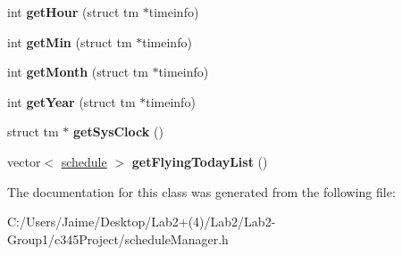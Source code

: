 \begin{DoxyCompactItemize}
\item 
\hypertarget{classschedule_manager_a78ccab8b133ca7f7fe31bf6766cbd026}{
int {\bfseries getHour} (struct tm $\ast$timeinfo)}
\label{classschedule_manager_a78ccab8b133ca7f7fe31bf6766cbd026}

\item 
\hypertarget{classschedule_manager_aa83bfdf345a9cde974eebf53ce096e2e}{
int {\bfseries getMin} (struct tm $\ast$timeinfo)}
\label{classschedule_manager_aa83bfdf345a9cde974eebf53ce096e2e}

\item 
\hypertarget{classschedule_manager_ac440259dd73e6d0db0c13eddb2fcea49}{
int {\bfseries getMonth} (struct tm $\ast$timeinfo)}
\label{classschedule_manager_ac440259dd73e6d0db0c13eddb2fcea49}

\item 
\hypertarget{classschedule_manager_a7c4d7cf40bc8cf7ff3897760568c86f7}{
int {\bfseries getYear} (struct tm $\ast$timeinfo)}
\label{classschedule_manager_a7c4d7cf40bc8cf7ff3897760568c86f7}

\item 
\hypertarget{classschedule_manager_a3bb6686e4e82220feb2bf106315572ef}{
struct tm $\ast$ {\bfseries getSysClock} ()}
\label{classschedule_manager_a3bb6686e4e82220feb2bf106315572ef}

\item 
\hypertarget{classschedule_manager_ac14bdd4f7cf9378f5f7731bdb4f4feed}{
vector$<$ \hyperlink{classschedule}{schedule} $>$ {\bfseries getFlyingTodayList} ()}
\label{classschedule_manager_ac14bdd4f7cf9378f5f7731bdb4f4feed}

\end{DoxyCompactItemize}


The documentation for this class was generated from the following file:\begin{DoxyCompactItemize}
\item 
C:/Users/Jaime/Desktop/Lab2+(4)/Lab2/Lab2-\/Group1/c345Project/scheduleManager.h\end{DoxyCompactItemize}
